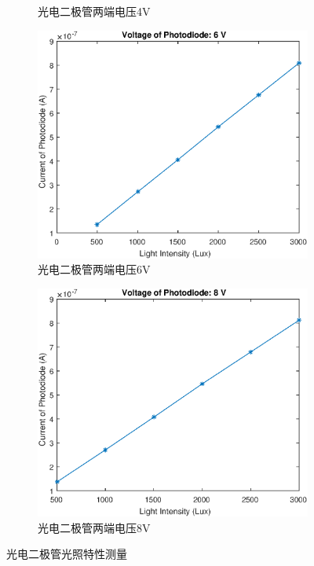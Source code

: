 \documentclass{ctexart}
\begin{document}
\begin{figure}[H]
\begin{subfigure}{.45\textwidth}
    \caption{光电二极管两端电压4V}
  \end{subfigure}
  \begin{subfigure}{.45\textwidth}
    \centering
    \includegraphics[width=\linewidth]{光电传感器综合实验图像/photodiode_6V}
    \caption{光电二极管两端电压6V}
  \end{subfigure}
  \begin{subfigure}{.45\textwidth}
    \centering
    \includegraphics[width=\linewidth]{光电传感器综合实验图像/photodiode_8V}
    \caption{光电二极管两端电压8V}
  \end{subfigure}
  \caption{光电二极管光照特性测量}
\end{figure}
\end{document}
